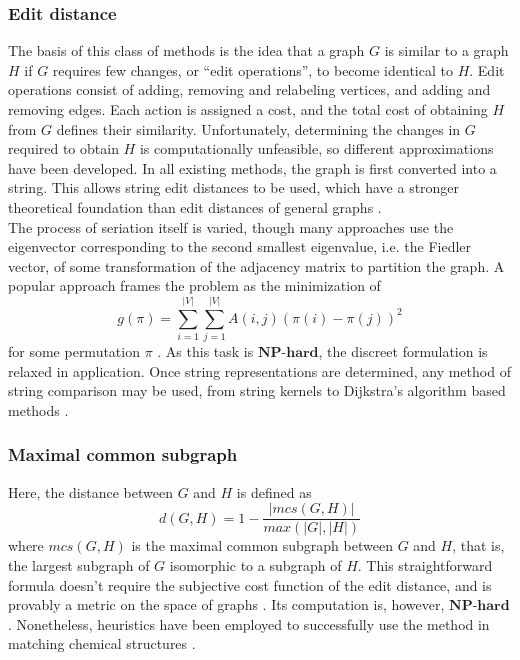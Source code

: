 \documentclass[11pt]{article}
\begin{document}
\subsubsection{Edit distance}
\indent The basis of this class of methods is the idea that a graph $G$ is similar to a graph $H$ if $G$ requires few changes, or ``edit operations'', to become identical to $H$. Edit operations consist of adding, removing and relabeling vertices, and adding and removing edges. Each action is assigned a cost, and the total cost of obtaining $H$ from $G$ defines their similarity. Unfortunately, determining the changes in $G$ required to obtain $H$ is computationally unfeasible, so different approximations have been developed. In all existing methods, the graph is first converted into a string. This allows string edit distances to be used, which have a stronger theoretical foundation than edit distances of general graphs \cite{Gao2009}. \vspace{1mm}\\
\indent The process of seriation itself is varied, though many approaches use the eigenvector corresponding to the second smallest eigenvalue, i.e. the Fiedler vector, of some transformation of the adjacency matrix to partition the graph. A popular approach frames the problem as the minimization of
\[
g(\pi) = \sum \limits_{i=1}^{|V|} \sum \limits_{j=1}^{|V|} A(i,j)(\pi(i) - \pi(j))^2
\]
for some permutation $\pi$ \cite{Atkins1994}. As this task is $\textbf{NP-hard}$, the discreet formulation is relaxed in application. Once string representations are determined, any method of string comparison may be used, from string kernels to Dijkstra's algorithm based methods \cite{Hancock2006} \cite{Robles-Kelly2004}. 
\subsubsection{Maximal common subgraph}
\indent Here, the distance between $G$ and $H$ is defined as
\[
d(G,H) = 1 - \frac{|mcs(G, H)|}{max(|G|,|H|)}
\]
where $mcs(G,H)$ is the maximal common subgraph between $G$ and $H$, that is, the largest subgraph of $G$ isomorphic to a subgraph of $H$. This straightforward formula doesn't require the subjective cost function of the edit distance, and is provably a metric on the space of graphs \cite{Bunke1998}. Its computation is, however, $\textbf{NP-hard}$. Nonetheless, heuristics have been employed to successfully use the method in matching chemical structures \cite{Raymond2002}.
\end{document}
